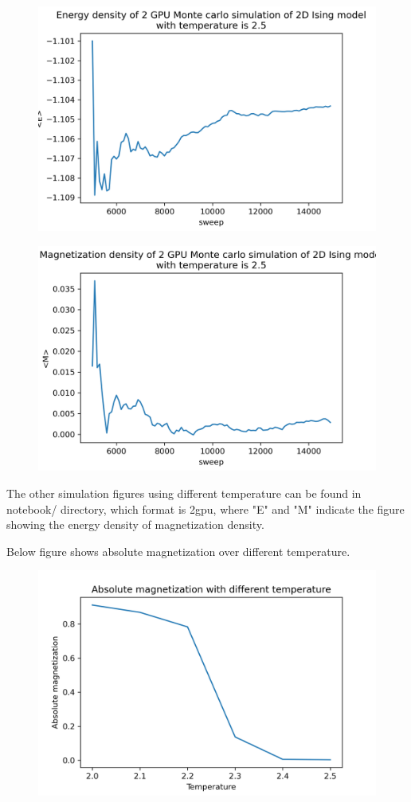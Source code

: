 \documentclass{article}
\begin{document}
	\begin{figure}[hb!]
		\centering
		\includegraphics[width=0.9\linewidth]{notebook/2gpu_2.5_E}
	\end{figure}
	\begin{figure}[hb!]
		\centering
		\includegraphics[width=0.9\linewidth]{notebook/2gpu_2.5_M}
	\end{figure}	

	The other simulation figures using different temperature can be found in notebook/ directory, which format is 2gpu\textunderscore[E][M],
where "E" and "M" indicate the figure showing the energy density of magnetization density.
	
	\newpage
	Below figure shows absolute magnetization over different temperature.
	
	\begin{figure}[hb!]
		\centering
		\includegraphics[width=0.9\linewidth]{notebook/2gpu_absolute_magnetization}
	\end{figure}	
	
\end{document}
